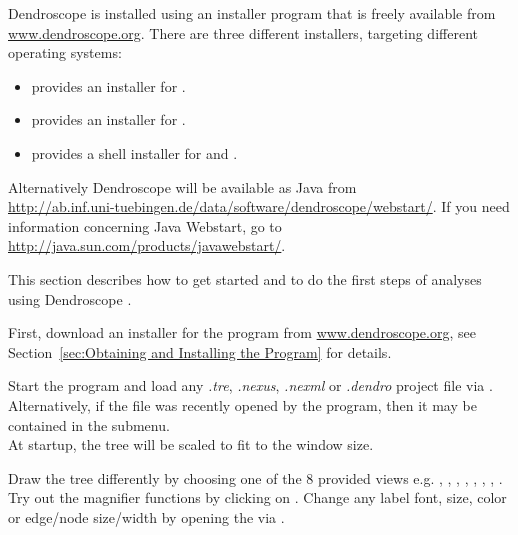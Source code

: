 \documentclass[11pt]{article}
\def\Dendroscope{{\sf Dendroscope }}
\begin{document}
\Dendroscope is installed using an installer program that is freely available
from\\
\href{http://www.dendroscope.org}
{www.dendroscope.org}.
There are three different installers, targeting different operating systems:
\begin{itemize}
\item {} provides an installer for .
\item {} provides an installer for .
\item {} provides a shell installer for
 and .
\end{itemize}

Alternatively \Dendroscope will be available as Java  from \\
\href{http://ab.inf.uni-tuebingen.de/data/software/dendroscope/webstart/}{http://ab.inf.uni-tuebingen.de/data/software/dendroscope/webstart/}.
If you need information concerning Java Webstart, go to \href{http://java.sun.com/products/javawebstart/}{http://java.sun.com/products/javawebstart/}.


This section describes how to get started and to do the first steps of analyses 
using \Dendroscope.

First, download an installer for the program from 
\href{http://www.dendroscope.org}
{www.dendroscope.org},
see Section~\ref{sec:Obtaining and Installing the Program}
for details.

Start the program and load any \textit{.tre}, \textit{.nexus}, \textit{.nexml} or \textit{.dendro} 
project file via . Alternatively, if the file
was recently opened by the program, then it may be contained in
the  submenu.\\
At startup, the tree will be scaled to fit to the window size. 

Draw the tree differently by choosing one of the 8 provided views e.g. 
,
,
,
,
,
,
,
.
Try out the magnifier functions by clicking on .
Change any label font, size, color or edge/node size/width by opening the  
via .
\end{document}

